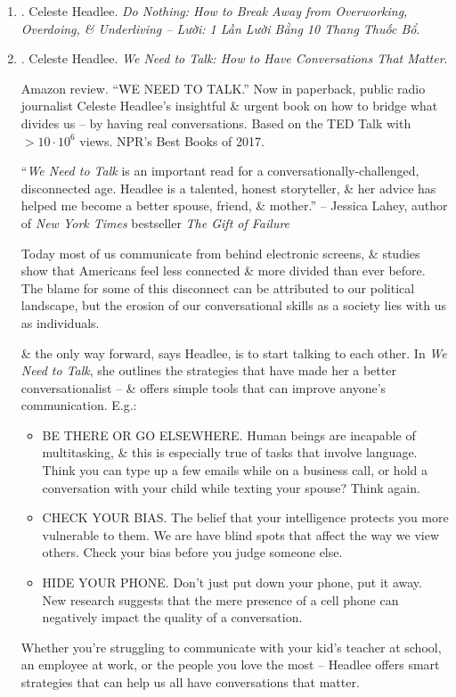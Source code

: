 \documentclass{article}
\begin{document}
\begin{enumerate}
	\item \cite{Headlee_do_nothing_VN}. {\sc Celeste Headlee}. {\it Do Nothing: How to Break Away from Overworking, Overdoing, \& Underliving -- Lười: 1 Lần Lười Bằng 10 Thang Thuốc Bổ}.

	\item \cite{Headlee_talk}. {\sc Celeste Headlee}. {\it We Need to Talk: How to Have Conversations That Matter}. {}

	{\sf Amazon review.} ``WE NEED TO TALK.'' Now in paperback, public radio journalist {\sc Celeste Headlee}'s insightful \& urgent book on how to bridge what divides us -- by having real conversations. Based on the TED Talk with $> 10\cdot10^6$ views. NPR's Best Books of 2017.

	``{\it We Need to Talk} is an important read for a conversationally-challenged, disconnected age. {\sc Headlee} is a talented, honest storyteller, \& her advice has helped me become a better spouse, friend, \& mother.'' -- {\sc Jessica Lahey}, author of {\it New York Times} bestseller {\it The Gift of Failure}

	Today most of us communicate from behind electronic screens, \& studies show that Americans feel less connected \& more divided than ever before. The blame for some of this disconnect can be attributed to our political landscape, but the erosion of our conversational skills as a society lies with us as individuals.

	\& the only way forward, says {\sc Headlee}, is to start talking to each other. In {\it We Need to Talk}, she outlines the strategies that have made her a better conversationalist -- \& offers simple tools that can improve anyone's communication. E.g.:
	\begin{itemize}
		\item BE THERE OR GO ELSEWHERE. Human beings are incapable of multitasking, \& this is especially true of tasks that involve language. Think you can type up a few emails while on a business call, or hold a conversation with your child while texting your spouse? Think again.
		\item CHECK YOUR BIAS. The belief that your intelligence protects you more vulnerable to them. We are have blind spots that affect the way we view others. Check your bias before you judge someone else.
		\item HIDE YOUR PHONE. Don't just put down your phone, put it away. New research suggests that the mere presence of a cell phone can negatively impact the quality of a conversation.
	\end{itemize}
	Whether you're struggling to communicate with your kid's teacher at school, an employee at work, or the people you love the most -- {\sc Headlee} offers smart strategies that can help us all have conversations that matter.


\end{enumerate}
\end{document}
